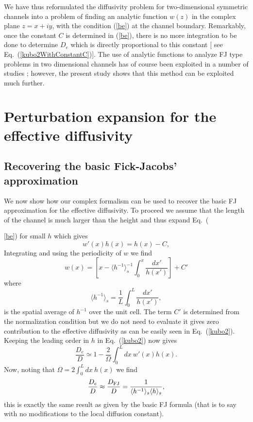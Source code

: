 \documentclass[pre,showpacs,preprintnumbers,amsmath,amssymb,superscriptaddress]{revtex4-1}
\begin{document}
{We have thus reformulated the diffusivity problem for two-dimensional symmetric channels into a problem of finding an analytic function $w(z)$ in the complex plane $z=x+iy$, with the condition (\ref{be}) at the channel boundary. Remarkably, once the constant $C$ is determined in (\ref{be}), there is no more integration to be done to determine $D_e$ which is directly proportional to this constant [ see Eq.~(\ref{kubo2WithConstantC})]. The use of analytic functions to analyze FJ type problems in two dimensional channels has of course been exploited in a number of studies \cite{kal2010,kal2014,kal2015}; however, the present study shows that this method can be exploited much further.  

\section{Perturbation expansion for the effective diffusivity}
\label{Sec3}

\subsection{Recovering the basic Fick-Jacobs' approximation}
We now show how our complex formalism can be used to recover the basic FJ approximation for the effective diffusivity.
To proceed we assume that the length of the channel is much larger than the height and thus expand Eq.~({\ref{be}) for small
$h$ which gives
\begin{equation}
w'(x)h(x) = h(x) - C,
\end{equation}
Integrating and using the periodicity of $w$ we find
\begin{equation}
w(x) = \left[x- \langle h^{-1}\rangle^{-1}_s\int_0^x \frac{dx'}{h(x')}\right] + C'
\end{equation}
where 
\begin{equation}
\langle h^{-1}\rangle_s = \frac{1}{L}\int _0^L \frac{dx'}{h(x')},
\end{equation}
is the spatial average of $h^{-1}$ over the unit cell. The term $C'$ is determined from the normalization condition
but we do not need to evaluate it gives zero contribution to the effective diffusivity as can be easily seen in Eq.~(\ref{kubo2}). 
Keeping the leading order in $h$ in Eq.~(\ref{kubo2}) now gives
\begin{equation}
\frac{D_e}{D}  \simeq 1 - \frac{2}{\Omega} \int_0^L d{x} \ w'({x})h(x).
\end{equation}
Now, noting that $\Omega = 2\int_0^L dx\ h(x)$ we find
\begin{equation}
\frac{D_e}{D} \approx \frac{D_{\rm FJ}}{D} = \frac{1}{\langle h^{-1}\rangle_s\langle h\rangle_s},\label{fj}
\end{equation}
this is exactly the same result as given by the basic FJ formula (that is to say with no modifications to the local diffusion constant). 

}}
\end{document}
